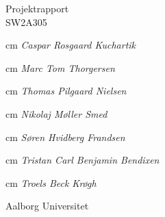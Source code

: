  \begin{center}
    {\large
      Projektrapport%
    }\\
    \vspace{0.2cm}
    {\Large
      SW2A305%
    }
		\vspace{2 cm}
		\begin{flushleft}
			 cm
			\Large
			\textit{Caspar Rosgaard Kuchartik}
		\end{flushleft}
		\begin{flushright}
			\hangindent=2 cm
			\Large
			\textit{Marc Tom Thorgersen}
		\end{flushright}
		\begin{flushleft}
			\parindent=2 cm
			\Large
			\textit{Thomas Pilgaard Nielsen}
		\end{flushleft}
		\begin{flushright}
			 cm
			\Large
			\textit{Nikolaj Møller Smed}
		\end{flushright}
		\begin{flushleft}
			\hangindent=2 cm
			\Large
			\textit{Søren Hvidberg Frandsen}
		\end{flushleft}
		\begin{flushright}
			\hangindent=2 cm
			\Large
			\textit{Tristan Carl Benjamin Bendixen}
		\end{flushright}
		\begin{flushleft}
			\hangindent=2 cm
			\Large
			\textit{Troels Beck Krøgh}
		\end{flushleft}

  \end{center}
  \vfill
  \begin{center}
  Aalborg Universitet\\
  \end{center}
